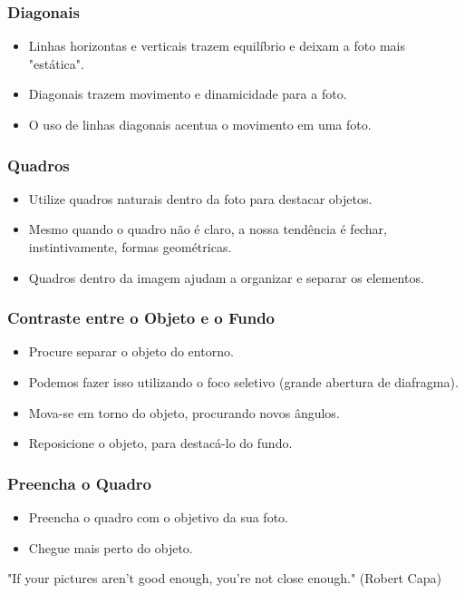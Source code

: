 \begin{frame}
    \frametitle{Diagonais}
    \begin{itemize}
      \item Linhas horizontas e verticais trazem equilíbrio e deixam a foto mais "estática".
      \item Diagonais trazem movimento e dinamicidade para a foto.
      \item O uso de linhas diagonais acentua o movimento em uma foto.
    \end{itemize}
\end{frame}

\begin{frame}
    \frametitle{Quadros}
    \begin{itemize}
      \item Utilize quadros naturais dentro da foto para destacar objetos.
      \item Mesmo quando o quadro não é claro, a nossa tendência é fechar, instintivamente,
      formas geométricas.
      \item Quadros dentro da imagem ajudam a organizar e separar os elementos.
    \end{itemize}
\end{frame}

\begin{frame}
    \frametitle{\Large Contraste entre o Objeto e o Fundo}
    \begin{itemize}
      \item Procure separar o objeto do entorno.
      \item Podemos fazer isso utilizando o foco seletivo (grande abertura de diafragma).
      \item Mova-se em torno do objeto, procurando novos ângulos.
      \item Reposicione o objeto, para destacá-lo do fundo.
    \end{itemize}
\end{frame}

\begin{frame}
    \frametitle{Preencha o Quadro}
    \begin{itemize}
      \item Preencha o quadro com o objetivo da sua foto.
      \item Chegue mais perto do objeto.
    \end{itemize}
    \begin{center}
      "If your pictures aren’t good enough, you’re not close enough." (Robert Capa)
    \end{center}
\end{frame}

